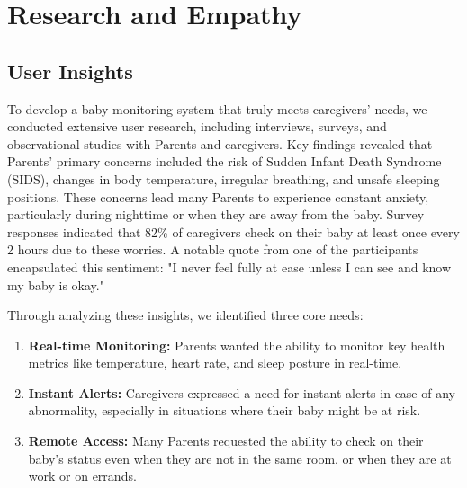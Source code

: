 \documentclass[12pt,a4paper]{report}
\begin{document}
\chapter{Research and Empathy}
\section{User Insights}
To develop a baby monitoring system that truly meets caregivers' needs, we conducted extensive user research, including interviews, surveys, and observational studies with Parents and caregivers. Key findings revealed that Parents’ primary concerns included the risk of Sudden Infant Death Syndrome (SIDS), changes in body temperature, irregular breathing, and unsafe sleeping positions. These concerns lead many Parents to experience constant anxiety, particularly during nighttime or when they are away from the baby. Survey responses indicated that 82\% of caregivers check on their baby at least once every 2 hours due to these worries. A notable quote from one of the participants encapsulated this sentiment: "I never feel fully at ease unless I can see and know my baby is okay."

Through analyzing these insights, we identified three core needs:
\begin{enumerate}
  \item \textbf{Real-time Monitoring:} Parents wanted the ability to monitor key health metrics like temperature, heart rate, and sleep posture in real-time.
  \item \textbf{Instant Alerts:} Caregivers expressed a need for instant alerts in case of any abnormality, especially in situations where their baby might be at risk.
  \item \textbf{Remote Access:} Many Parents requested the ability to check on their baby’s status even when they are not in the same room, or when they are at work or on errands.
\end{enumerate}
\end{document}
